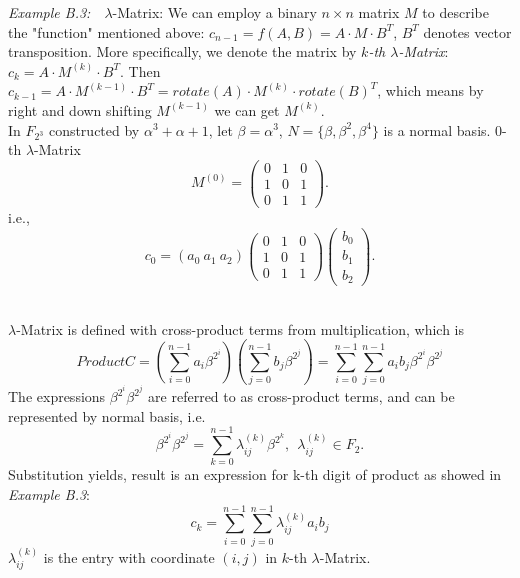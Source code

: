 \textit{Example B.3:}\ \ $\lambda$-Matrix: We can employ a binary $n\times n$ matrix $M$ to describe the "function"
 mentioned above: $c_{n-1} = f(A, B) = A \cdot M \cdot B^T$, $B^T$ denotes vector transposition. 
More specifically, we denote the matrix by \emph{$k$-th $\lambda$-Matrix}: $c_k = A \cdot M^{(k)} \cdot B^T$.
Then $c_{k-1} = A \cdot M^{(k-1)} \cdot B^T = rotate(A) \cdot M^{(k)} \cdot rotate(B)^T$, which means
by right and down shifting $M^{(k-1)}$ we can get $M^{(k)}$.\\
In $F_{2^3}$ constructed by $\alpha^3 + \alpha + 1$, let $\beta = \alpha^3$, $N = \{ \beta, \beta^2, \beta^4\}$ 
is a normal basis. $0$-th $\lambda$-Matrix
\begin{equation}
M^{(0)} = \left(
\begin{array} {lcr}
0 & 1 & 0\\
1 & 0 & 1\\
0 & 1 & 1
\end{array} \right).
\end{equation}
i.e.,
\begin{equation}
c_0 = (a_0\  a_1\  a_2)\left(
\begin{array} {lcr}
0 & 1 & 0\\
1 & 0 & 1\\
0 & 1 & 1
\end{array} \right)\left(
\begin{array} {lcr}
b_0\\
b_1\\
b_2
\end{array} \right).
\end{equation}

\indent \\
$\lambda$-Matrix is defined with cross-product terms from multiplication, which is 
\begin{equation}
Product C = (\sum_{i=0}^{n-1}a_i\beta^{2^i})(\sum_{j=0}^{n-1}b_j\beta^{2^j}) = \sum_{i=0}^{n-1}\sum_{j=0}^{n-1}a_ib_j\beta^{2^i}\beta^{2^j}
\end{equation}
The expressions $\beta^{2^i}\beta^{2^j}$ are referred to as cross-product terms, and can be represented by
normal basis, i.e.
\begin{equation}
\beta^{2^i}\beta^{2^j} = \sum_{k=0}^{n-1}\lambda_{ij}^{(k)}\beta^{2^k}, \ \ \lambda_{ij}^{(k)} \in F_2.
\end{equation}
Substitution yields, result is an expression for k-th digit of product as showed in \textit{Example B.3}:
\begin{equation}
c_k = \sum_{i=0}^{n-1}\sum_{j=0}^{n-1}\lambda_{ij}^{(k)}a_ib_j
\end{equation}
$\lambda_{ij}^{(k)}$ is the entry with coordinate $(i,j)$ in $k$-th $\lambda$-Matrix.\par

